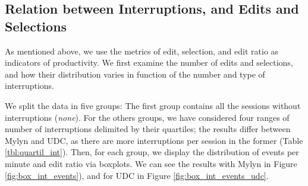 \documentclass[times]{smrauth}
\begin{document}






\subsection{Relation between Interruptions, and Edits and Selections}

As mentioned above, we use the metrics of edit, selection, and edit ratio as indicators of productivity. We first examine the number of edits and selections, and how their distribution varies in function of the number and type of interruptions.

We split the data in five groups: The first group contains all the sessions without interruptions (\textit{none}). For the others groups, we have considered four ranges of number of interruptions delimited by their quartiles; the results differ between Mylyn and UDC, as there are more interruptions per session in the former (Table \ref{tbl:quartil_int}). Then, for each group, we display the distribution of events per minute and edit ratio via boxplots. We can see the results with Mylyn in Figure \ref{fig:box_int_events}), and for UDC in Figure \ref{fig:box_int_events_udc}.
\end{document}
